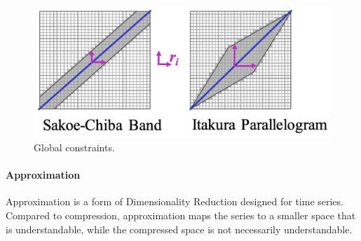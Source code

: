 \begin{figure}[ht]
    \centering
    \includegraphics[width=0.7\linewidth]{img/dtw_global_constr.png}
    \caption{Global constraints.}
    \label{fig:dtw-global-constr}
\end{figure}

\paragraph{Approximation}

Approximation is a form of Dimensionality Reduction designed for time series. Compared to compression, approximation maps the series to a smaller space that is understandable, while the compressed space is not necessarily understandable.

